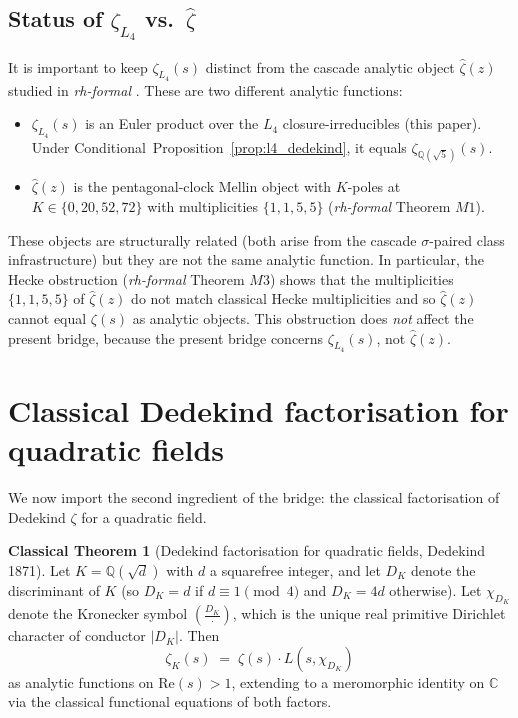 \documentclass[11pt,a4paper]{article}
\theoremstyle{definition}
\newtheorem{classical}[theorem]{Classical Theorem}
\theoremstyle{remark}
\begin{document}
\subsection{Status of $\zeta_{L_4}$ vs.\ $\hat{\zeta}$}

It is important to keep $\zeta_{L_4}(s)$ distinct from the cascade
analytic object $\hat{\zeta}(z)$ studied in \emph{rh-formal}
\cite{rhFormalSmart}. These are two different analytic functions:

\begin{itemize}
\item $\zeta_{L_4}(s)$ is an Euler product over the $L_4$
      closure-irreducibles (this paper). Under
      Conditional~Proposition~\ref{prop:l4_dedekind}, it equals
      $\zeta_{\mathbb{Q}(\sqrt{5})}(s)$.
\item $\hat{\zeta}(z)$ is the pentagonal-clock Mellin object with
      $K$-poles at $K \in \{0, 20, 52, 72\}$ with multiplicities
      $\{1, 1, 5, 5\}$ (\emph{rh-formal} Theorem $M1$).
\end{itemize}

These objects are structurally related (both arise from the cascade
$\sigma$-paired class infrastructure) but they are not the same
analytic function. In particular, the Hecke obstruction
(\emph{rh-formal} Theorem $M3$) shows that the multiplicities
$\{1,1,5,5\}$ of $\hat{\zeta}(z)$ do not match classical Hecke
multiplicities and so $\hat{\zeta}(z)$ cannot equal $\zeta(s)$ as
analytic objects. This obstruction does \emph{not} affect the present
bridge, because the present bridge concerns $\zeta_{L_4}(s)$, not
$\hat{\zeta}(z)$.

\section{Classical Dedekind factorisation for quadratic fields}\label{sec:dedekind_fact}

We now import the second ingredient of the bridge: the classical
factorisation of Dedekind $\zeta$ for a quadratic field.

\begin{classical}[Dedekind factorisation for quadratic fields, Dedekind 1871]\label{thm:dedekind_factorisation}
Let $K = \mathbb{Q}(\sqrt{d})$ with $d$ a squarefree integer, and let
$D_K$ denote the discriminant of $K$ (so $D_K = d$ if $d \equiv 1
\pmod 4$ and $D_K = 4d$ otherwise). Let $\chi_{D_K}$ denote the
Kronecker symbol $\left(\tfrac{D_K}{\cdot}\right)$, which is the unique
real primitive Dirichlet character of conductor $|D_K|$. Then
\begin{equation}
  \zeta_K(s) \;=\; \zeta(s) \cdot L(s, \chi_{D_K})
\end{equation}
as analytic functions on $\mathrm{Re}(s) > 1$, extending to a
meromorphic identity on $\mathbb{C}$ via the classical functional
equations of both factors.
\end{classical}
\end{document}
